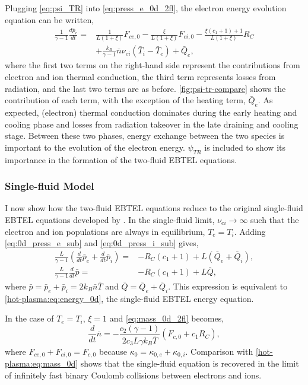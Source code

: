 Plugging \autoref{eq:psi_TR} into \autoref{eq:press_e_0d_2fl}, the electron energy evolution equation can be written,
\begin{align}
    \frac{1}{\gamma -1}\frac{d\bar{p}_e}{dt} =& \frac{1}{L(1+\xi)}F_{ce,0} - \frac{\xi}{L(1+\xi)}F_{ci,0} - \frac{\xi(c_1+1) + 1}{L(1+\xi)}R_C \label{eq:press_e_0d_2fl_breakdown}\\
    &+ \frac{k_B}{\gamma-1}\bar{n}\nu_{ei}(\bar{T}_i-\bar{T}_e) + \bar{Q}_e, \nonumber
\end{align}
where the first two terms on the right-hand side represent the contributions from electron and ion thermal conduction, the third term represents losses from radiation, and the last two terms are as before. \autoref{fig:psi-tr-compare} shows the contribution of each term, with the exception of the heating term, $\bar{Q}_e$. As expected, (electron) thermal conduction dominates during the early heating and cooling phase and losses from radiation takeover in the late draining and cooling stage. Between these two phases, energy exchange between the two species is important to the evolution of the electron energy. $\psi_{TR}$ is included to show its importance in the formation of the two-fluid EBTEL equations.

\subsubsection{Single-fluid Model}\label{sec:ebtel-single-fluid}

I now show how the two-fluid EBTEL equations reduce to the original single-fluid EBTEL equations developed by \citet{klimchuk_highly_2008,cargill_enthalpy-based_2012}. In the single-fluid limit, $\nu_{ei}\to\infty$ such that the electron and ion populations are always in equilibrium, $T_e=T_i$. Adding \autoref{eq:0d_press_e_sub} and \autoref{eq:0d_press_i_sub} gives,
\begin{align}
    \frac{L}{\gamma - 1}\left(\frac{d}{dt}\bar{p}_e + \frac{d}{dt}\bar{p}_i\right) =& -R_C(c_1 + 1) + L(\bar{Q}_e + \bar{Q}_i), \nonumber\\
    \frac{L}{\gamma - 1}\frac{d}{dt}\bar{p} =& -R_C(c_1 + 1) + L\bar{Q},\nonumber
\end{align}
where $\bar{p}=\bar{p}_e+\bar{p}_i=2k_B\bar{n}\bar{T}$ and $\bar{Q}=\bar{Q}_e+\bar{Q}_i$. This expression is equivalent to \autoref{hot-plasma:eq:energy_0d}, the single-fluid EBTEL energy equation.

In the case of $T_e=T_i$, $\xi=1$ and \autoref{eq:mass_0d_2fl} becomes,
\begin{equation}
\frac{d}{dt}\bar{n} = -\frac{c_2(\gamma - 1)}{2c_3L\gamma k_B\bar{T}}(F_{c,0} + c_1R_C),
\end{equation}
where $F_{ce,0} + F_{ci,0}=F_{c,0}$ because $\kappa_0 = \kappa_{0,e} + \kappa_{0,i}$. Comparison with \autoref{hot-plasma:eq:mass_0d} shows that the single-fluid equation is recovered in the limit of infinitely fast binary Coulomb collisions between electrons and ions.

